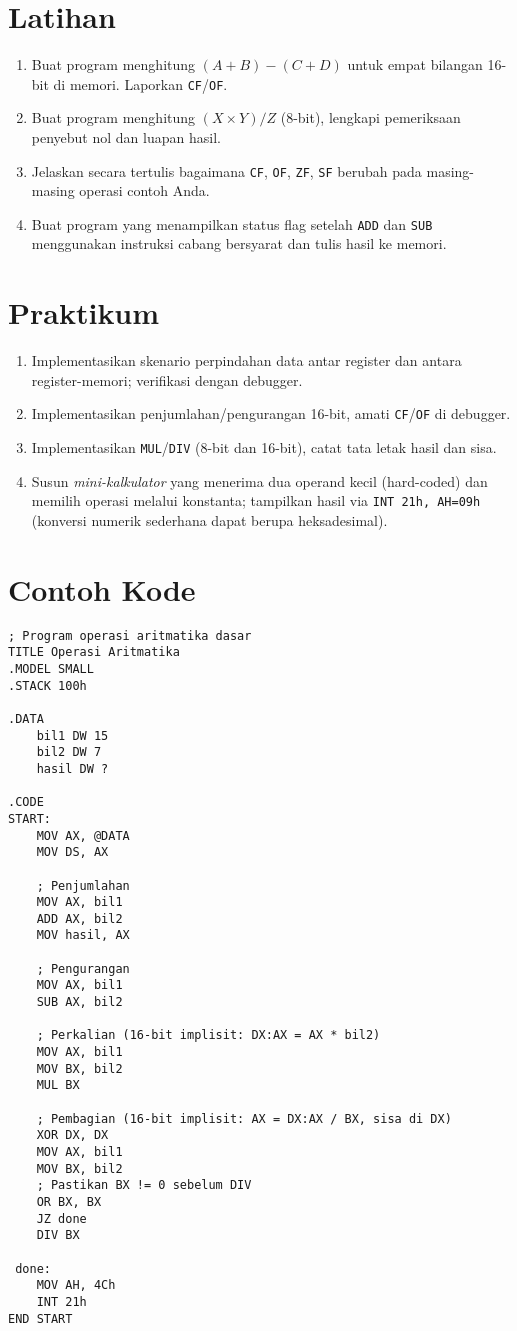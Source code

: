 \section{Latihan}
\begin{enumerate}
  \item Buat program menghitung \((A+B) - (C+D)\) untuk empat bilangan 16-bit di memori. Laporkan \texttt{CF}/\texttt{OF}.
  \item Buat program menghitung \((X \times Y) / Z\) (8-bit), lengkapi pemeriksaan penyebut nol dan luapan hasil.
  \item Jelaskan secara tertulis bagaimana \texttt{CF}, \texttt{OF}, \texttt{ZF}, \texttt{SF} berubah pada masing-masing operasi contoh Anda.
  \item Buat program yang menampilkan status flag setelah \texttt{ADD} dan \texttt{SUB} menggunakan instruksi cabang bersyarat dan tulis hasil ke memori.
\end{enumerate}

\section{Praktikum}
\begin{enumerate}
  \item Implementasikan skenario perpindahan data antar register dan antara register-memori; verifikasi dengan debugger.
  \item Implementasikan penjumlahan/pengurangan 16-bit, amati \texttt{CF}/\texttt{OF} di debugger.
  \item Implementasikan \texttt{MUL}/\texttt{DIV} (8-bit dan 16-bit), catat tata letak hasil dan sisa.
  \item Susun \textit{mini-kalkulator} yang menerima dua operand kecil (hard-coded) dan memilih operasi melalui konstanta; tampilkan hasil via \texttt{INT 21h, AH=09h} (konversi numerik sederhana dapat berupa heksadesimal).
\end{enumerate}

\section{Contoh Kode}
\begin{verbatim}
; Program operasi aritmatika dasar
TITLE Operasi Aritmatika
.MODEL SMALL
.STACK 100h

.DATA
    bil1 DW 15
    bil2 DW 7
    hasil DW ?

.CODE
START:
    MOV AX, @DATA
    MOV DS, AX
    
    ; Penjumlahan
    MOV AX, bil1
    ADD AX, bil2
    MOV hasil, AX
    
    ; Pengurangan
    MOV AX, bil1
    SUB AX, bil2
    
    ; Perkalian (16-bit implisit: DX:AX = AX * bil2)
    MOV AX, bil1
    MOV BX, bil2
    MUL BX
    
    ; Pembagian (16-bit implisit: AX = DX:AX / BX, sisa di DX)
    XOR DX, DX
    MOV AX, bil1
    MOV BX, bil2
    ; Pastikan BX != 0 sebelum DIV
    OR BX, BX
    JZ done
    DIV BX

 done:
    MOV AH, 4Ch
    INT 21h
END START
\end{verbatim}

